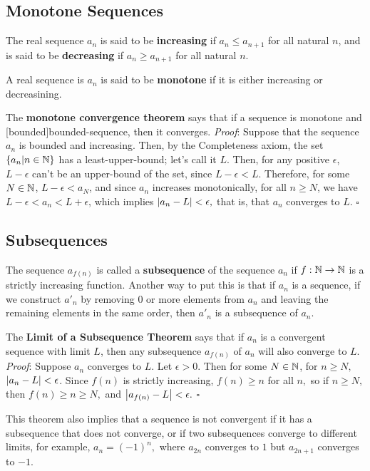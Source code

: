 \documentclass{article}
\begin{document}
\subsection{Monotone Sequences}

The real sequence $a_n$ is said to be \textbf{increasing} if $a_n \leq a_{n+1}$ for all natural $n$, and is said to be \textbf{decreasing} if $a_n \geq a_{n+1}$ for all natural $n$.

A real sequence is $a_n$ is said to be \textbf{monotone} if it is either increasing or decreasining.

The \textbf{monotone convergence theorem} says that if a sequence is monotone and \@[bounded]{bounded-sequence}, then it converges. \emph{Proof}: Suppose that the sequence $a_n$ is bounded and increasing. Then, by the Completeness axiom, the set $\left\{ a_n | n \in \mathbb{N} \right\}$ has a \@{least-upper-bound}; let's call it $L.$ Then, for any positive $\epsilon$, $L - \epsilon$ can't be an \@{upper-bound} of the set, since $L - \epsilon < L$. Therefore, for some $N \in \mathbb{N}$, $L - \epsilon < a_N$, and since $a_n$ increases monotonically, for all $n \geq N$, we have $L - \epsilon < a_n < L + \epsilon$, which implies $\left| a_n - L \right| < \epsilon,$ that is, that $a_n$ converges to $L$. $\square$

\subsection{Subsequences}

The sequence $a_{f(n)}$ is called a \textbf{subsequence} of the sequence $a_n$ if $f : \mathbb{N} \to \mathbb{N}$ is a strictly increasing function. Another way to put this is that if $a_n$ is a sequence, if we construct $a'_n$ by removing $0$ or more elements from $a_n$ and leaving the remaining elements in the same order, then $a'_n$ is a \@{subsequence} of $a_n.$

The \textbf{Limit of a Subsequence Theorem} says that if $a_n$ is a convergent sequence with limit $L$, then any subsequence $a_{f(n)}$ of $a_n$ will also converge to $L.$ \emph{Proof}: Suppose $a_n$ converges to $L.$ Let $\epsilon > 0.$ Then for some $N \in \mathbb{N}$, for $n \geq N,$ $\left| a_n - L \right| < \epsilon$. Since $f(n)$ is strictly increasing, $f(n) \geq n$ for all $n,$ so if $n \geq N,$ then $f(n) \geq n \geq N,$ and $\left| a_{f(n)} - L \right| < \epsilon.$ $\square$

This theorem also implies that a sequence is not convergent if it has a subsequence that does not converge, or if two subsequences converge to different limits, for example, $a_n = (-1)^n,$ where $a_{2n}$ converges to $1$ but $a_{2n+1}$ converges to $-1$.
\end{document}
